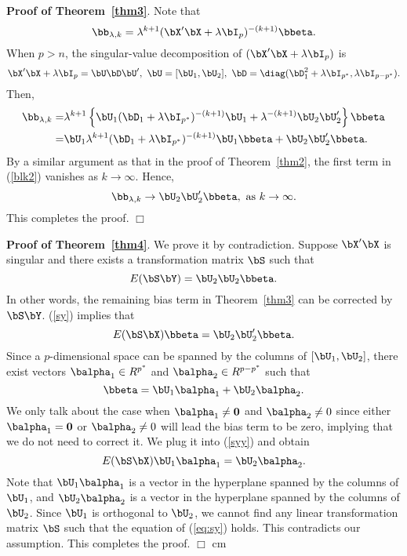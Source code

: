 {{{\bf Proof of Theorem~\ref{thm3}}. Note that
\[\bb_{\lambda,k}=\lambda^{k+1}(\bX'\bX+\lambda\bI_p)^{-(k+1)}\bbeta.\]
When $p>n$, the singular-value decomposition of $(\bX'\bX+\lambda\bI_p)$ is
\[\bX'\bX+\lambda\bI_p=\bU\bD\bU',\,\,\bU=[\bU_1,\bU_2],\,\,\bD=\diag(\bD_1^2+\lambda\bI_{p^*},\lambda\bI_{p-p^*}).\]
Then, 
\begin{align}\label{blk2}
 \bb_{\lambda,k}=&\lambda^{k+1}\left\{\bU_1(\bD_1+\lambda\bI_{p^*})^{-(k+1)}\bU_1+\lambda^{-(k+1)}\bU_2\bU_2'\right\}\bbeta\notag\\
 =&\bU_1\lambda^{k+1}(\bD_1+\lambda\bI_{p^*})^{-(k+1)}\bU_1\bbeta+\bU_2\bU_2'\bbeta.
\end{align}
By a similar argument as that in the proof of Theorem~\ref{thm2}, the first term in (\ref{blk2}) vanishes as $k\rightarrow \infty$. Hence, 
\[ \bb_{\lambda,k}\rightarrow \bU_2\bU_2'\bbeta,\,\,\text{as $k\rightarrow\infty$}.\]
This completes the proof. $\Box$
\vskip 0.5cm

{\bf Proof of Theorem~\ref{thm4}}. We prove it by contradiction. Suppose $\bX'\bX$ is singular and there exists a transformation matrix $\bS$ such that
\begin{equation}\label{sy}
 E(\bS\bY)=\bU_2\bU_2\bbeta.
\end{equation}
In other words, the remaining bias term in Theorem~\ref{thm3} can be corrected by $\bS\bY$.
(\ref{sy}) implies that
\begin{equation}\label{syy}
E(\bS\bX)\bbeta=\bU_2\bU_2'\bbeta.    
\end{equation}
Since a $p$-dimensional space can be spanned by the columns of $[\bU_1,\bU_2]$, there exist vectors $\balpha_1\in R^{p^*}$ and $\balpha_2\in R^{p-p^*}$ such that
\[\bbeta=\bU_1\balpha_1+\bU_2\balpha_2.\]
We only talk about the case when $\balpha_1\neq{\bf 0}$ and $\balpha_2\neq 0 $ since either $\balpha_1={\bf 0}$ or $\balpha_2\neq 0 $ will lead the bias term to be zero, implying that we do not need to correct it.
We plug it into (\ref{syy}) and obtain
\begin{equation}\label{eq:sy}
 E(\bS\bX)\bU_1\balpha_1=\bU_2\balpha_2.
\end{equation}
Note that $\bU_1\balpha_1$ is a vector in the hyperplane spanned by the columns of $\bU_1$, and $\bU_2\balpha_2$ is a vector in the hyperplane spanned by the columns of $\bU_2$. Since $\bU_1$ is orthogonal to $\bU_2$, we cannot find any linear transformation matrix $\bS$ such that the equation of (\ref{eq:sy}) holds. This contradicts our assumption. This completes the proof. $\Box$
 cm

}}
